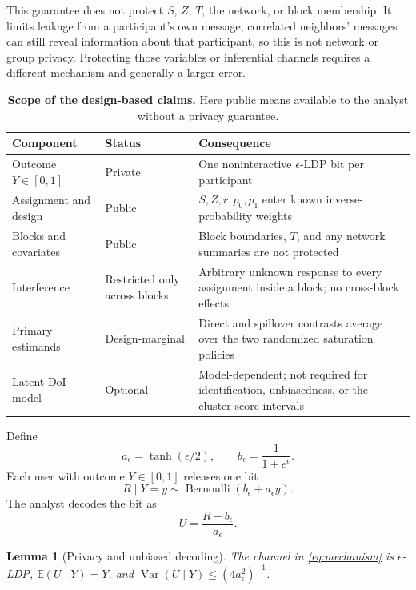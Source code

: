 \documentclass[11pt]{article}
\newtheorem{lemma}[theorem]{Lemma}
\theoremstyle{definition}
\theoremstyle{remark}
\newcommand{\E}{\mathbb{E}}
\newcommand{\Var}{\operatorname{Var}}
\newcommand{\doisig}{a_{\epsilon}}
\DeclareMathOperator{\Bern}{Bernoulli}
\begin{document}
This guarantee does not protect $S$, $Z$, $T$, the network, or block membership. It limits
leakage from a participant's own message; correlated neighbors' messages can still reveal
information about that participant, so this is not network or group privacy. Protecting those
variables or inferential channels requires a different mechanism and generally a larger error.

\begin{table}[htbp]
\centering
\caption{\textbf{Scope of the design-based claims.} Here public means available to the analyst
without a privacy guarantee.}
\label{tab:scope}
\small
\begin{tabular}{p{}p{}p{}}
\toprule
Component & Status & Consequence \\
\midrule
Outcome $Y\in[0,1]$ & Private & One noninteractive $\epsilon$-LDP bit per participant \\
Assignment and design & Public & $S,Z,r,p_0,p_1$ enter known inverse-probability weights \\
Blocks and covariates & Public & Block boundaries, $T$, and any network summaries are not protected \\
Interference & Restricted only across blocks & Arbitrary unknown response to every assignment
inside a block; no cross-block effects \\
Primary estimands & Design-marginal & Direct and spillover contrasts average over the two
randomized saturation policies \\
Latent DoI model & Optional & Model-dependent; not required for identification, unbiasedness,
or the cluster-score intervals \\
\bottomrule
\end{tabular}
\end{table}

Define
\[
  \doisig=\tanh(\epsilon/2),
  \qquad b_{\epsilon}=\frac{1}{1+e^{\epsilon}}.
\]
Each user with outcome $Y\in[0,1]$ releases one bit
\begin{equation}
  R\mid Y=y\sim\Bern\!\left(b_{\epsilon}+\doisig y\right).
  \label{eq:mechanism}
\end{equation}
The analyst decodes the bit as
\begin{equation}
  U=\frac{R-b_{\epsilon}}{\doisig}.
  \label{eq:decode}
\end{equation}

\begin{lemma}[Privacy and unbiased decoding]
\label{lem:mechanism}
The channel in \eqref{eq:mechanism} is $\epsilon$-LDP, $\E(U\mid Y)=Y$, and
$\Var(U\mid Y)\le (4\doisig^2)^{-1}$.
\end{lemma}
\end{document}
